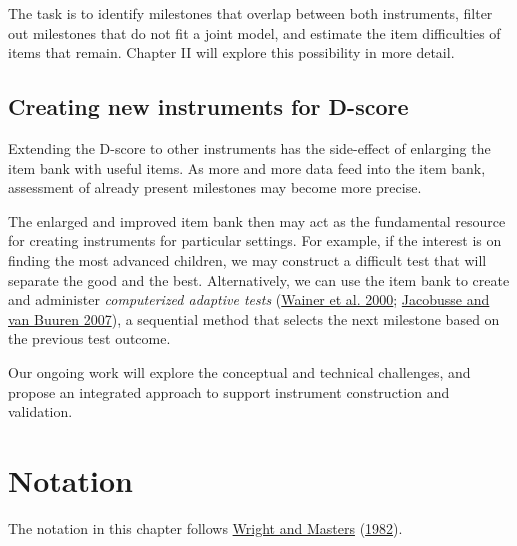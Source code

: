 \documentclass[
]{book}
\begin{document}
The task is to identify milestones that overlap between both instruments, filter out milestones that do not fit a joint model, and estimate the item difficulties of items that remain. Chapter II will explore this possibility in more detail.

\hypertarget{creating-new-instruments-for-d-score}{%
\section{Creating new instruments for D-score}\label{creating-new-instruments-for-d-score}}

Extending the D-score to other instruments has the side-effect of enlarging the item bank with useful items. As more and more data feed into the item bank, assessment of already present milestones may become more precise.

The enlarged and improved item bank then may act as the fundamental resource for creating instruments for particular settings. For example, if the interest is on finding the most advanced children, we may construct a difficult test that will separate the good and the best. Alternatively, we can use the item bank to create and administer \emph{computerized adaptive tests} (\protect\hyperlink{ref-wainer2000}{Wainer et al. 2000}; \protect\hyperlink{ref-jacobusse2007}{Jacobusse and van Buuren 2007}), a sequential method that selects the next milestone based on the previous test outcome.

Our ongoing work will explore the conceptual and technical challenges, and propose an integrated approach to support instrument construction and validation.

\hypertarget{appendix-appendices}{%
\appendix}


\hypertarget{ap:notation}{%
\chapter{Notation}\label{ap:notation}}

The notation in this chapter follows \protect\hyperlink{ref-wright1982}{Wright and Masters} (\protect\hyperlink{ref-wright1982}{1982}).
\end{document}
